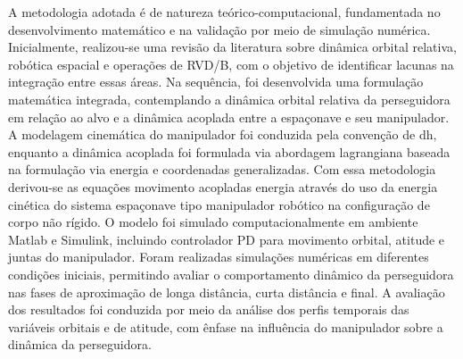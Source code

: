 A metodologia adotada é de natureza teórico-computacional, fundamentada no desenvolvimento matemático e na validação por meio de simulação numérica. Inicialmente, realizou-se uma revisão da literatura sobre dinâmica orbital relativa, robótica espacial e operações de RVD/B, com o objetivo de identificar lacunas na integração entre essas áreas.
Na sequência, foi desenvolvida uma formulação matemática integrada, contemplando a dinâmica orbital relativa da perseguidora em relação ao alvo e a dinâmica acoplada entre a espaçonave e seu manipulador. 
A modelagem cinemática do manipulador foi conduzida pela convenção de \gls{dh}, enquanto a dinâmica acoplada foi formulada via abordagem lagrangiana baseada na formulação via energia e coordenadas generalizadas. Com essa metodologia derivou-se as equações movimento acopladas energia através do uso da energia cinética do sistema espaçonave tipo manipulador robótico na configuração de corpo não rígido.
O modelo foi simulado computacionalmente em ambiente Matlab e Simulink, incluindo controlador PD para movimento orbital, atitude e juntas do manipulador. Foram realizadas simulações numéricas em diferentes condições iniciais, permitindo avaliar o comportamento dinâmico da perseguidora nas fases de aproximação de longa distância, curta distância e final.
A avaliação dos resultados foi conduzida por meio da análise dos perfis temporais das variáveis orbitais e de atitude, com ênfase na influência do manipulador sobre a dinâmica da perseguidora.
